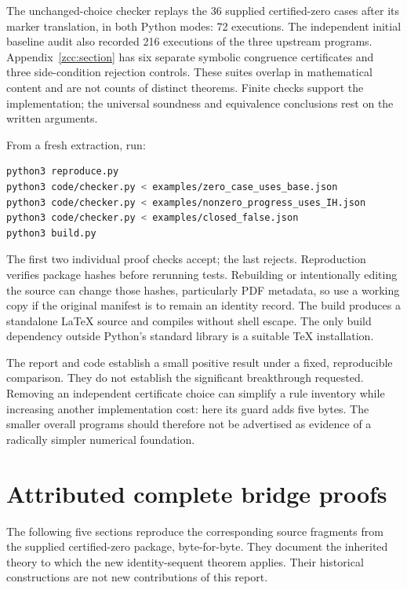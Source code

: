 \documentclass[11pt,letterpaper]{article}
\theoremstyle{definition}\newtheorem{definition}[theorem]{Definition}
\theoremstyle{remark}\newtheorem{remark}[theorem]{Remark}
\begin{document}
The unchanged-choice checker replays the 36 supplied certified-zero
cases after its marker translation, in both Python modes: 72 executions.
The independent initial baseline audit also recorded 216 executions of
the three upstream programs. Appendix~\ref{zcc:section} has six separate
symbolic congruence certificates and three side-condition rejection controls.
These suites overlap in mathematical content and are not counts of
distinct theorems. Finite checks support the implementation; the universal
soundness and equivalence conclusions rest on the written arguments.

From a fresh extraction, run:
\begin{lstlisting}[language=bash]
python3 reproduce.py
python3 code/checker.py < examples/zero_case_uses_base.json
python3 code/checker.py < examples/nonzero_progress_uses_IH.json
python3 code/checker.py < examples/closed_false.json
python3 build.py
\end{lstlisting}
The first two individual proof checks accept; the last rejects.
Reproduction verifies package hashes before rerunning tests. Rebuilding
or intentionally editing the source can change those hashes, particularly
PDF metadata, so use a working copy if the original manifest is to remain
an identity record. The build produces a standalone LaTeX source and
compiles without shell escape. The only build dependency outside Python's
standard library is a suitable TeX installation.

The report and code establish a small positive result under a fixed,
reproducible comparison. They do not establish the significant breakthrough
requested. Removing an independent certificate choice can simplify a rule
inventory while increasing another implementation cost: here its guard
adds five bytes. The smaller overall programs should therefore not be
advertised as evidence of a radically simpler numerical foundation.

\clearpage
\appendix
\section*{Attributed complete bridge proofs}
The following five sections reproduce the corresponding source fragments
from the supplied certified-zero package, byte-for-byte. They document the
inherited theory to which the new identity-sequent theorem applies. Their
historical constructions are not new contributions of this report.
\end{document}
